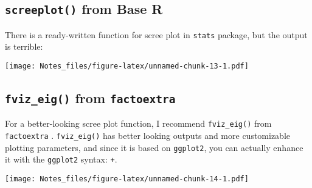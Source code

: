 \documentclass[]{book}
\newenvironment{Shaded}{\begin{snugshade}}{\end{snugshade}}
\newcommand{\KeywordTok}[1]{\textcolor[rgb]{0.13,0.29,0.53}{\textbf{#1}}}
\newcommand{\DataTypeTok}[1]{\textcolor[rgb]{0.13,0.29,0.53}{#1}}
\newcommand{\DecValTok}[1]{\textcolor[rgb]{0.00,0.00,0.81}{#1}}
\newcommand{\StringTok}[1]{\textcolor[rgb]{0.31,0.60,0.02}{#1}}
\newcommand{\CommentTok}[1]{\textcolor[rgb]{0.56,0.35,0.01}{\textit{#1}}}
\newcommand{\OperatorTok}[1]{\textcolor[rgb]{0.81,0.36,0.00}{\textbf{#1}}}
\newcommand{\NormalTok}[1]{#1}
\theoremstyle{definition}
\theoremstyle{definition}
\theoremstyle{definition}
\theoremstyle{remark}
\begin{document}
\subsection{\texorpdfstring{\texttt{screeplot()} from Base
R}{screeplot() from Base R}}\label{screeplot-from-base-r}

There is a ready-written function for scree plot in \texttt{stats}
package, but the output is terrible:

\begin{Shaded}
\end{Shaded}

\texttt{[image: Notes\_files/figure-latex/unnamed-chunk-13-1.pdf]}

\subsection{\texorpdfstring{\texttt{fviz\_eig()} from
\texttt{factoextra}}{fviz\_eig() from factoextra}}\label{fviz_eig-from-factoextra}

For a better-looking scree plot function, I recommend
\texttt{fviz\_eig()} from \texttt{factoextra} \citep{R-factoextra}.
\texttt{fviz\_eig()} has better looking outputs and more customizable
plotting parameters, and since it is based on \texttt{ggplot2}, you can
actually enhance it with the \texttt{ggplot2} syntax: \texttt{+}.

\begin{Shaded}
\end{Shaded}

\texttt{[image: Notes\_files/figure-latex/unnamed-chunk-14-1.pdf]}

\begin{Shaded}
\end{Shaded}
\end{document}
